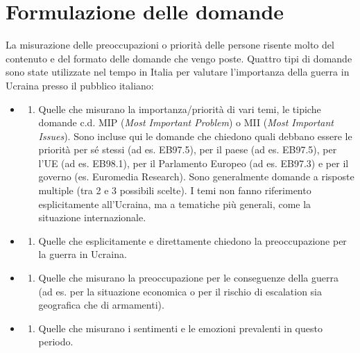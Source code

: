 \documentclass[
]{book}
\providecommand{\tightlist}{%
  \setlength{\itemsep}{0pt}\setlength{\parskip}{0pt}}
\begin{document}
\hypertarget{formulazione-delle-domande}{%
\section{Formulazione delle domande}\label{formulazione-delle-domande}}

La misurazione delle preoccupazioni o priorità delle persone risente molto del contenuto e del formato delle domande che vengo poste. Quattro tipi di domande sono state utilizzate nel tempo in Italia per valutare l'importanza della guerra in Ucraina presso il pubblico italiano:

\begin{itemize}
\item
  \begin{enumerate}
  \def\labelenumi{\alph{enumi})}
  \tightlist
  \item
    Quelle che misurano la importanza/priorità di vari temi, le tipiche domande c.d. MIP (\emph{Most Important Problem}) o MII (\emph{Most Important Issues}). Sono incluse qui le domande che chiedono quali debbano essere le priorità per sé stessi (ad es. EB97.5), per il paese (ad es. EB97.5), per l'UE (ad es. EB98.1), per il Parlamento Europeo (ad es. EB97.3) e per il governo (es. Euromedia Research). Sono generalmente domande a risposte multiple (tra 2 e 3 possibili scelte). I temi non fanno riferimento esplicitamente all'Ucraina, ma a tematiche più generali, come la situazione internazionale.
  \end{enumerate}
\item
  \begin{enumerate}
  \def\labelenumi{\alph{enumi})}
  \setcounter{enumi}{1}
  \tightlist
  \item
    Quelle che esplicitamente e direttamente chiedono la preoccupazione per la guerra in Ucraina.
  \end{enumerate}
\item
  \begin{enumerate}
  \def\labelenumi{\alph{enumi})}
  \setcounter{enumi}{2}
  \tightlist
  \item
    Quelle che misurano la preoccupazione per le conseguenze della guerra (ad es. per la situazione economica o per il rischio di escalation sia geografica che di armamenti).
  \end{enumerate}
\item
  \begin{enumerate}
  \def\labelenumi{\alph{enumi})}
  \setcounter{enumi}{3}
  \tightlist
  \item
    Quelle che misurano i sentimenti e le emozioni prevalenti in questo periodo.
  \end{enumerate}
\end{itemize}
\end{document}
